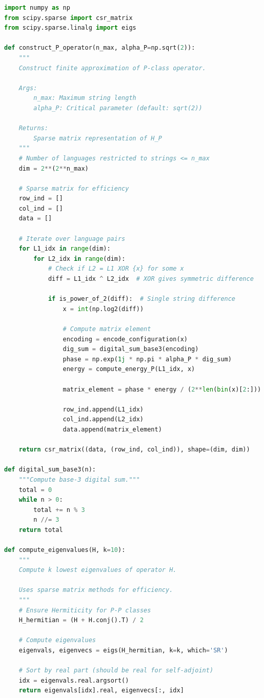 \documentclass[12pt]{article}
\theoremstyle{plain}
\theoremstyle{definition}
\begin{document}
\begin{lstlisting}[language=Python, caption=Evolution Operator Construction]
import numpy as np
from scipy.sparse import csr_matrix
from scipy.sparse.linalg import eigs

def construct_P_operator(n_max, alpha_P=np.sqrt(2)):
    """
    Construct finite approximation of P-class operator.
    
    Args:
        n_max: Maximum string length
        alpha_P: Critical parameter (default: sqrt(2))
    
    Returns:
        Sparse matrix representation of H_P
    """
    # Number of languages restricted to strings <= n_max
    dim = 2**(2**n_max)
    
    # Sparse matrix for efficiency
    row_ind = []
    col_ind = []
    data = []
    
    # Iterate over language pairs
    for L1_idx in range(dim):
        for L2_idx in range(dim):
            # Check if L2 = L1 XOR {x} for some x
            diff = L1_idx ^ L2_idx  # XOR gives symmetric difference
            
            if is_power_of_2(diff):  # Single string difference
                x = int(np.log2(diff))
                
                # Compute matrix element
                encoding = encode_configuration(x)
                dig_sum = digital_sum_base3(encoding)
                phase = np.exp(1j * np.pi * alpha_P * dig_sum)
                energy = compute_energy_P(L1_idx, x)
                
                matrix_element = phase * energy / (2**len(bin(x)[2:]))
                
                row_ind.append(L1_idx)
                col_ind.append(L2_idx)
                data.append(matrix_element)
    
    return csr_matrix((data, (row_ind, col_ind)), shape=(dim, dim))

def digital_sum_base3(n):
    """Compute base-3 digital sum."""
    total = 0
    while n > 0:
        total += n % 3
        n //= 3
    return total

def compute_eigenvalues(H, k=10):
    """
    Compute k lowest eigenvalues of operator H.
    
    Uses sparse matrix methods for efficiency.
    """
    # Ensure Hermiticity for P-P classes
    H_hermitian = (H + H.conj().T) / 2
    
    # Compute eigenvalues
    eigenvals, eigenvecs = eigs(H_hermitian, k=k, which='SR')
    
    # Sort by real part (should be real for self-adjoint)
    idx = eigenvals.real.argsort()
    return eigenvals[idx].real, eigenvecs[:, idx]
\end{lstlisting}
\end{document}

